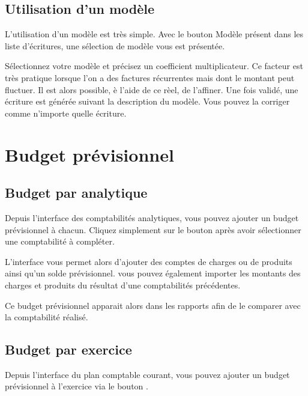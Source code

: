 \documentclass[a4paper,10pt,oneside,french]{sphinxmanual}
\begin{document}
\subsection{Utilisation d’un modèle}
\label{\detokenize{accounting/model:utilisation-d-un-modele}}
L’utilisation d’un modèle est très simple. Avec le bouton Modèle présent dans les liste d’écritures, une sélection de modèle vous est présentée.
\begin{quote}

\noindent{}
\end{quote}

Sélectionnez votre modèle et précisez un coefficient multiplicateur. Ce facteur est très pratique lorsque l’on a des factures récurrentes mais dont le montant peut fluctuer. Il est alors possible, è l’aide de ce rèel, de l’affiner.
Une fois validé, une écriture est générée suivant la description du modèle. Vous pouvez la corriger comme n’importe quelle écriture.


\section{Budget prévisionnel}
\label{\detokenize{accounting/budget:budget-previsionnel}}\label{\detokenize{accounting/budget::doc}}

\subsection{Budget par analytique}
\label{\detokenize{accounting/budget:budget-par-analytique}}
Depuis l’interface des comptabilités analytiques, vous pouvez ajouter un budget prévisionnel à chacun.
Cliquez simplement sur le bouton  après avoir sélectionner une comptabilité à compléter.

L’interface vous permet alors d’ajouter des comptes de charges ou de produits ainsi qu’un solde prévisionnel.
vous pouvez également importer les montants des charges et produits du résultat d’une comptabilités précédentes.

Ce budget prévisionnel apparait alors dans les rapports afin de le comparer avec la comptabilité réalisé.


\subsection{Budget par exercice}
\label{\detokenize{accounting/budget:budget-par-exercice}}
Depuis l’interface du plan comptable courant, vous pouvez ajouter un budget prévisionnel à l’exercice via le bouton .
\end{document}
